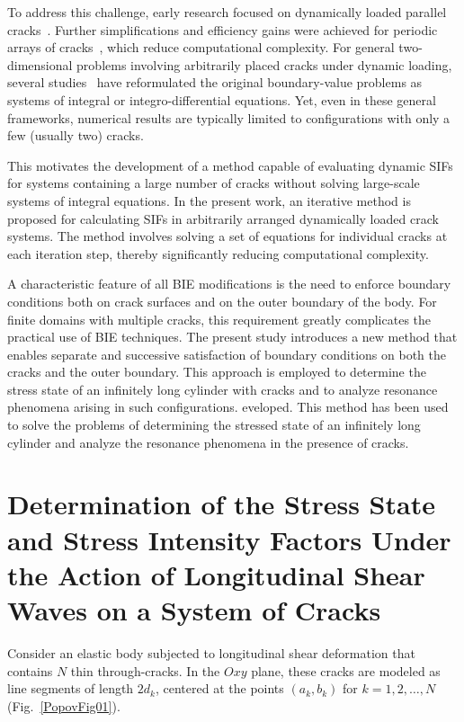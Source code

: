 To address this challenge, early research focused on dynamically loaded parallel cracks~\cite{Popov10, Popov18, Popov19, Popov23}. Further simplifications and efficiency gains were achieved for periodic arrays of cracks~\cite{Popov4, Popov20, Popov30}, which reduce computational complexity. For general two-dimensional problems involving arbitrarily placed cracks under dynamic loading, several studies~\cite{Popov13, Popov3, Popov9, Popov11, Popov12, Popov29} have reformulated the original boundary-value problems as systems of integral or integro-differential equations. Yet, even in these general frameworks, numerical results are typically limited to configurations with only a few (usually two) cracks.

This motivates the development of a method capable of evaluating dynamic SIFs for systems containing a large number of cracks without solving large-scale systems of integral equations. In the present work, an iterative method is proposed for calculating SIFs in arbitrarily arranged dynamically loaded crack systems. The method involves solving a set of equations for individual cracks at each iteration step, thereby significantly reducing computational complexity.

A characteristic feature of all BIE modifications is the need to enforce boundary conditions both on crack surfaces and on the outer boundary of the body. For finite domains with multiple cracks, this requirement greatly complicates the practical use of BIE techniques. The present study introduces a new method that enables separate and successive satisfaction of boundary conditions on both the cracks and the outer boundary. This approach is employed to determine the stress state of an infinitely long cylinder with cracks and to analyze resonance phenomena arising in such configurations.
eveloped. This method has been used to solve the problems of determining the stressed state of an infinitely long cylinder and analyze the resonance phenomena in the presence of cracks.


\section{Determination of the Stress State and Stress Intensity Factors Under the Action of Longitudinal Shear Waves on a System of Cracks}


Consider an elastic body subjected to longitudinal shear deformation that contains \( N \) thin through-cracks. In the \( Oxy \) plane, these cracks are modeled as line segments of length \( 2d_k \), centered at the points \( (a_k, b_k) \) for \( k = 1, 2, \dots, N \) (Fig.~\ref{PopovFig01}).

